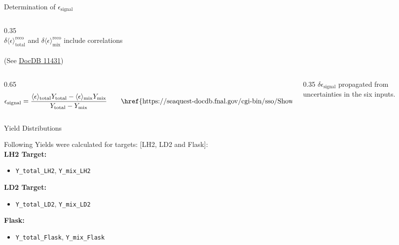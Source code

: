 \documentclass[aspectratio=169]{beamer}
\begin{document}
\begin{frame}{Determination of $\epsilon_{\text{signal}}$}
\begin{columns}[T]
\begin{column}{0.35\textwidth}
\vspace{0.4cm}\\
$\delta\langle\epsilon\rangle_{\text{total}}^{\text{reco}}$ and $\delta\langle\epsilon\rangle_{\text{mix}}^{\text{reco}}$ include correlations\\
\vspace{0.4cm}\\
(See \href{https://seaquest-docdb.fnal.gov/cgi-bin/sso/ShowDocument?docid=11431}{DocDB 11431})
\end{column}
\end{columns}
\centering
\begin{columns}[c]
\begin{column}{0.65\textwidth}
\begin{equation*}
\epsilon_{\text{signal}} = \frac{\langle \epsilon \rangle_{\text{total}} Y_{\text{total}} - \langle \epsilon \rangle_{\text{mix}} Y_{\text{mix}}}{Y_{\text{total}} - Y_{\text{mix}}} \qquad \text{\href{https://seaquest-docdb.fnal.gov/cgi-bin/sso/ShowDocument?docid=11448}{DocDB 11448}}
\end{equation*}
\end{column}
\begin{column}{0.35\textwidth}
\scriptsize
$\delta\epsilon_{\text{signal}}$ propagated from uncertainties in the six inputs.
\end{column}
\end{columns}
\normalsize


\end{frame}

\begin{frame}{Yield Distributions}
    
Following Yields were calculated for targets: [LH2, LD2 and Flask]:\\
\vspace{0.3cm}
\textbf{LH2 Target:}
\begin{itemize}
    \item \texttt{Y\_total\_LH2}, \texttt{Y\_mix\_LH2}
\end{itemize}
\textbf{LD2 Target:}
\begin{itemize}
    \item \texttt{Y\_total\_LD2}, \texttt{Y\_mix\_LD2}
\end{itemize}
\textbf{Flask:}
\begin{itemize}
    \item \texttt{Y\_total\_Flask}, \texttt{Y\_mix\_Flask}
\end{itemize}

\end{frame}
\end{document}
